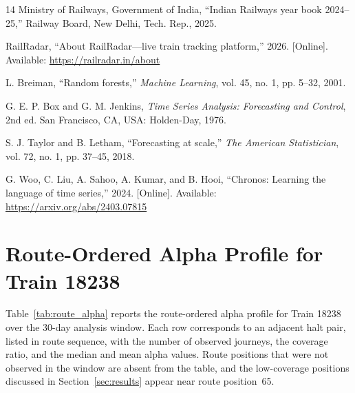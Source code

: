 \documentclass[conference]{IEEEtran}
\begin{document}
\begin{thebibliography}{14}
Ministry of Railways, Government of India, ``Indian Railways year book 2024--25,'' Railway Board, New Delhi, Tech. Rep., 2025.

RailRadar, ``About RailRadar---live train tracking platform,'' 2026. [Online]. Available: \url{https://railradar.in/about}

L. Breiman, ``Random forests,'' \emph{Machine Learning}, vol. 45, no. 1, pp. 5--32, 2001.

G. E. P. Box and G. M. Jenkins, \emph{Time Series Analysis: Forecasting and Control}, 2nd ed. San Francisco, CA, USA: Holden-Day, 1976.

S. J. Taylor and B. Letham, ``Forecasting at scale,'' \emph{The American Statistician}, vol. 72, no. 1, pp. 37--45, 2018.

G. Woo, C. Liu, A. Sahoo, A. Kumar, and B. Hooi, ``Chronos: Learning the language of time series,'' 2024. [Online]. Available: \url{https://arxiv.org/abs/2403.07815}

\end{thebibliography}

\appendices

\setlength{\dbltextfloatsep}{10pt plus 2pt minus 2pt}
\setlength{\textfloatsep}{10pt plus 2pt minus 2pt}
\setlength{\dblfloatsep}{10pt plus 2pt minus 2pt}
\setlength{\abovecaptionskip}{4pt}
\setlength{\belowcaptionskip}{4pt}

\section{Route-Ordered Alpha Profile for Train 18238}
\label{app:alpha}

Table~\ref{tab:route_alpha} reports the route-ordered alpha profile for Train 18238 over the 30-day analysis window. Each row corresponds to an adjacent halt pair, listed in route sequence, with the number of observed journeys, the coverage ratio, and the median and mean alpha values. Route positions that were not observed in the window are absent from the table, and the low-coverage positions discussed in Section~\ref{sec:results} appear near route position~65.
\end{document}
